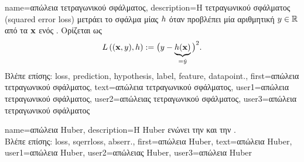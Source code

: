 {name={\foreignlanguage{greek}{απώλεια τετραγωνικού σφάλματος}},
	description={\foreignlanguage{greek}{Η} 
		 \foreignlanguage{greek}{τετραγωνικού σφάλματος} (squared error loss) \foreignlanguage{greek}{μετράει το σφάλμα} 
		 \foreignlanguage{greek}{μίας}  $h$ \foreignlanguage{greek}{όταν προβλέπει μία αριθμητική} 
		 $y \in \mathbb{R}$ \foreignlanguage{greek}{από τα}  ${\bf x}$ 
		\foreignlanguage{greek}{ενός} . \foreignlanguage{greek}{Ορίζεται ως}  
		\begin{equation} 
			\nonumber
			L\left(({\bf x},y),h \right) := \big(y - \underbrace{h({\bf x})}_{=\hat{y}} \big)^{2}. 
		\end{equation} 
		\foreignlanguage{greek}{Βλέπε επίσης:} \gls{loss}, \gls{prediction}, \gls{hypothesis}, \gls{label}, \gls{feature}, \gls{datapoint}.},
	first={\foreignlanguage{greek}{απώλεια τετραγωνικού σφάλματος}},
	text={\foreignlanguage{greek}{απώλεια τετραγωνικού σφάλματος}},
	user1={\foreignlanguage{greek}{απώλεια τετραγωνικού σφάλματος}}, %
	user2={\foreignlanguage{greek}{απώλειας τετραγωνικού σφάλματος}}, %
	user3={\foreignlanguage{greek}{απώλεια τετραγωνικού σφάλματος}} %
}

{name={\foreignlanguage{greek}{απώλεια} Huber}, 
	description={\foreignlanguage{greek}{Η} 
		 Huber \foreignlanguage{greek}{ενώνει την}  \foreignlanguage{greek}{και την} .\\
		\foreignlanguage{greek}{Βλέπε επίσης:} \gls{loss}, \gls{sqerrloss}, \gls{abserr}.},
	first={\foreignlanguage{greek}{απώλεια} Huber},
	text={\foreignlanguage{greek}{απώλεια} Huber},
	user1={\foreignlanguage{greek}{απώλεια} Huber}, %
	user2={\foreignlanguage{greek}{απώλειας} Huber}, %
	user3={\foreignlanguage{greek}{απώλεια} Huber} %
}

